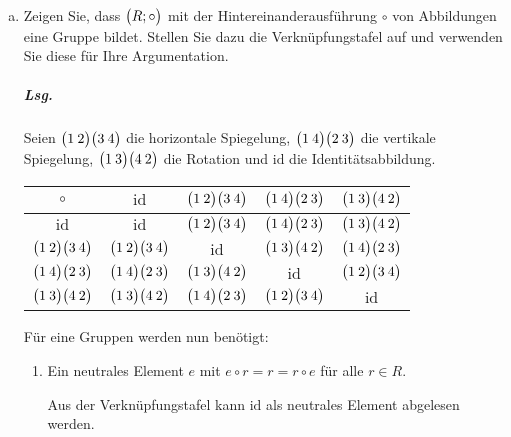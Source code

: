 \documentclass{scrreprt}
\begin{document}
\begin{enumerate}[(a)]
\newpage
\item Zeigen Sie, dass $\qty\big(R; \circ)$ mit der Hintereinanderausführung
  $\circ$ von Abbildungen eine Gruppe bildet.
  Stellen Sie dazu die Verknüpfungstafel auf und verwenden Sie diese für Ihre
  Argumentation.

  \subparagraph{Lsg.} Seien
  \colorbox{red!20}{$\qty\big(1\:2) \qty\big(3\:4)$} die horizontale
  Spiegelung, \colorbox{blue!20}{$\qty\big(1\:4)\qty\big(2\:3)$} die
  vertikale Spiegelung, \colorbox{green!20}{$\qty\big(1\:3)\qty\big(4\:2)$}
  die Rotation und \colorbox{orange!20}{$\text{id}$} die Identitätsabbildung.

  \begin{tabular}{|c|cccc|}
    \hline
    $\circ$
    & \colorbox{orange!20}{$\text{id}$}
    & \colorbox{red!20}{$\qty\big(1\:2) \qty\big(3\:4)$}
    & \colorbox{blue!20}{$\qty\big(1\:4)\qty\big(2\:3)$}
    & \colorbox{green!20}{$\qty\big(1\:3)\qty\big(4\:2)$} \\
    \hline
    \colorbox{orange!20}{$\text{id}$}
    & \colorbox{orange!20}{$\text{id}$}
    & \colorbox{red!20}{$\qty\big(1\:2) \qty\big(3\:4)$}
    & \colorbox{blue!20}{$\qty\big(1\:4)\qty\big(2\:3)$}
    & \colorbox{green!20}{$\qty\big(1\:3)\qty\big(4\:2)$} \\
    \colorbox{red!20}{$\qty\big(1\:2) \qty\big(3\:4)$}
    & \colorbox{red!20}{$\qty\big(1\:2) \qty\big(3\:4)$}
    & \colorbox{orange!20}{$\text{id}$}
    & \colorbox{green!20}{$\qty\big(1\:3)\qty\big(4\:2)$}
    & \colorbox{blue!20}{$\qty\big(1\:4)\qty\big(2\:3)$} \\
    \colorbox{blue!20}{$\qty\big(1\:4)\qty\big(2\:3)$}
    & \colorbox{blue!20}{$\qty\big(1\:4)\qty\big(2\:3)$}
    & \colorbox{green!20}{$\qty\big(1\:3)\qty\big(4\:2)$}
    & \colorbox{orange!20}{$\text{id}$}
    & \colorbox{red!20}{$\qty\big(1\:2) \qty\big(3\:4)$} \\
    \colorbox{green!20}{$\qty\big(1\:3)\qty\big(4\:2)$}
    & \colorbox{green!20}{$\qty\big(1\:3)\qty\big(4\:2)$}
    & \colorbox{blue!20}{$\qty\big(1\:4)\qty\big(2\:3)$}
    & \colorbox{red!20}{$\qty\big(1\:2) \qty\big(3\:4)$}
    & \colorbox{orange!20}{$\text{id}$} \\
    \hline
  \end{tabular}
  Für eine Gruppen werden nun benötigt:
  \begin{enumerate}[(1)]
  \item Ein neutrales Element $e$ mit $e \circ r = r = r \circ e$ für alle
    $r \in R$.

    Aus der Verknüpfungstafel kann $\text{id}$ als neutrales Element abgelesen
    werden.


\end{enumerate}
\end{enumerate}
\end{document}
